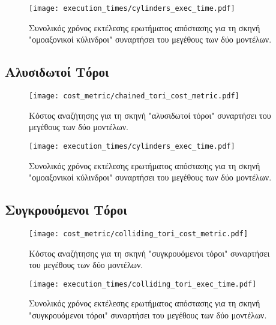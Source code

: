 \begin{figure}[H]
    \centering
    \texttt{[image: execution\_times/cylinders\_exec\_time.pdf]}
    \caption[Συνολικός Χρόνος Εκτέλεσης για "ομοαξονικοί κύλινδροι"] {
        Συνολικός χρόνος εκτέλεσης ερωτήματος απόστασης 
        για τη σκηνή "ομοαξονικοί κύλινδροι" συναρτήσει του μεγέθους των δύο μοντέλων.
    }
\end{figure}


\subsection{Αλυσιδωτοί Τόροι}
\begin{figure}[H]
    \centering
    \texttt{[image: cost\_metric/chained\_tori\_cost\_metric.pdf]}
    \caption[Κόστος Αναζήτησης για "αλυσιδωτοί τόροι"] {
        Κόστος αναζήτησης για τη σκηνή "αλυσιδωτοί τόροι" συναρτήσει 
        του μεγέθους των δύο μοντέλων.
    }
\end{figure}

\begin{figure}[H]
    \centering
    \texttt{[image: execution\_times/cylinders\_exec\_time.pdf]}
    \caption[Συνολικός Χρόνος Εκτέλεσης για "ομοαξονικοί κύλινδροι"] {
        Συνολικός χρόνος εκτέλεσης ερωτήματος απόστασης 
        για τη σκηνή "ομοαξονικοί κύλινδροι" συναρτήσει του μεγέθους των δύο μοντέλων.
    }
\end{figure}

\subsection{Συγκρουόμενοι Τόροι}
\begin{figure}[H]
    \centering
    \texttt{[image: cost\_metric/colliding\_tori\_cost\_metric.pdf]}
    \caption[Κόστος Αναζήτησης για "συγκρουόμενοι τόροι"] {
        Κόστος αναζήτησης για τη σκηνή "συγκρουόμενοι τόροι" συναρτήσει 
        του μεγέθους των δύο μοντέλων.
    }
\end{figure}

\begin{figure}[H]
    \centering
    \texttt{[image: execution\_times/colliding\_tori\_exec\_time.pdf]}
    \caption[Συνολικός Χρόνος Εκτέλεσης για "συγκρουόμενοι τόροι"] {
        Συνολικός χρόνος εκτέλεσης ερωτήματος απόστασης 
        για τη σκηνή "συγκρουόμενοι τόροι" συναρτήσει του μεγέθους των δύο μοντέλων.
    }
\end{figure}


